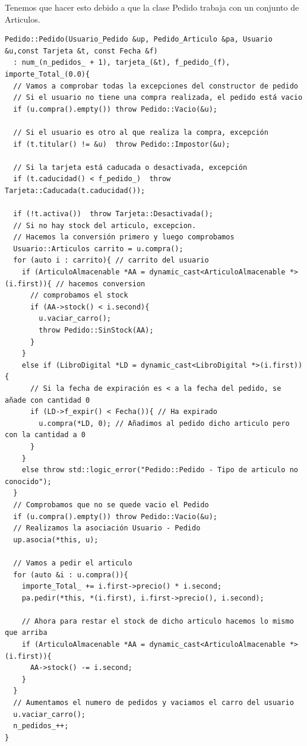 Tenemos que hacer esto debido a que la clase Pedido trabaja con un conjunto de Articulos.

\begin{verbatim}
Pedido::Pedido(Usuario_Pedido &up, Pedido_Articulo &pa, Usuario &u,const Tarjeta &t, const Fecha &f)
  : num_(n_pedidos_ + 1), tarjeta_(&t), f_pedido_(f), importe_Total_(0.0){
  // Vamos a comprobar todas la excepciones del constructor de pedido
  // Si el usuario no tiene una compra realizada, el pedido está vacio
  if (u.compra().empty()) throw Pedido::Vacio(&u);

  // Si el usuario es otro al que realiza la compra, excepción
  if (t.titular() != &u)  throw Pedido::Impostor(&u);

  // Si la tarjeta está caducada o desactivada, excepción
  if (t.caducidad() < f_pedido_)  throw Tarjeta::Caducada(t.caducidad());

  if (!t.activa())  throw Tarjeta::Desactivada();
  // Si no hay stock del articulo, excepcion.
  // Hacemos la conversión primero y luego comprobamos
  Usuario::Articulos carrito = u.compra();
  for (auto i : carrito){ // carrito del usuario
    if (ArticuloAlmacenable *AA = dynamic_cast<ArticuloAlmacenable *>(i.first)){ // hacemos conversion
      // comprobamos el stock
      if (AA->stock() < i.second){
        u.vaciar_carro();
        throw Pedido::SinStock(AA);
      }
    }
    else if (LibroDigital *LD = dynamic_cast<LibroDigital *>(i.first)){
      // Si la fecha de expiración es < a la fecha del pedido, se añade con cantidad 0
      if (LD->f_expir() < Fecha()){ // Ha expirado
        u.compra(*LD, 0); // Añadimos al pedido dicho articulo pero con la cantidad a 0
      }
    }
    else throw std::logic_error("Pedido::Pedido - Tipo de articulo no conocido");
  }
  // Comprobamos que no se quede vacio el Pedido
  if (u.compra().empty()) throw Pedido::Vacio(&u);
  // Realizamos la asociación Usuario - Pedido
  up.asocia(*this, u);

  // Vamos a pedir el articulo
  for (auto &i : u.compra()){
    importe_Total_ += i.first->precio() * i.second;
    pa.pedir(*this, *(i.first), i.first->precio(), i.second);

    // Ahora para restar el stock de dicho articulo hacemos lo mismo que arriba
    if (ArticuloAlmacenable *AA = dynamic_cast<ArticuloAlmacenable *>(i.first)){
      AA->stock() -= i.second;
    }
  }
  // Aumentamos el numero de pedidos y vaciamos el carro del usuario
  u.vaciar_carro();
  n_pedidos_++;
}
\end{verbatim}